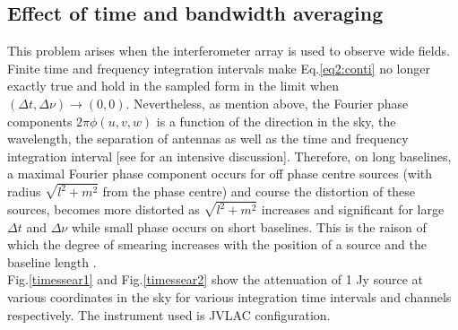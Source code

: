 \documentclass[useAMS,usenatbib]{mn2e}
\begin{document}
\subsection{Effect of time and bandwidth averaging}
\label{sec:effectbw}
This problem arises when the interferometer array is used to observe wide fields. Finite time and frequency 
integration intervals make  Eq.\ref{eq2:conti} no longer exactly true and hold in the sampled form in the limit when $(\Delta t, \Delta 
\nu) \rightarrow (0,0)$. Nevertheless, as mention 
above, the Fourier phase components $2\pi \phi(u,v,w)$ is a function of the direction in the sky, the wavelength, the separation of 
antennas as well as the time and frequency integration interval [see \citep{bregman2012system} for an intensive discussion]. Therefore, on 
long baselines, a maximal Fourier phase component occurs for off phase centre  sources (with radius $\sqrt{l^2 + m^2}$ from the phase 
centre) and course the distortion of these sources,  becomes more distorted as  $\sqrt{l^2 + m^2}$ increases and significant for large 
$\Delta t$ and  $\Delta \nu$ while small phase occurs on short baselines. This is the raison of which the degree of smearing 
increases with the position of a source and the baseline length \citep{bregman2012system}.\\
Fig.\ref{timessear1} and Fig.\ref{timessear2} show the attenuation of  1 Jy source at various coordinates in the sky for various 
integration time intervals and channels respectively. The instrument used is JVLAC configuration.
\end{document}
